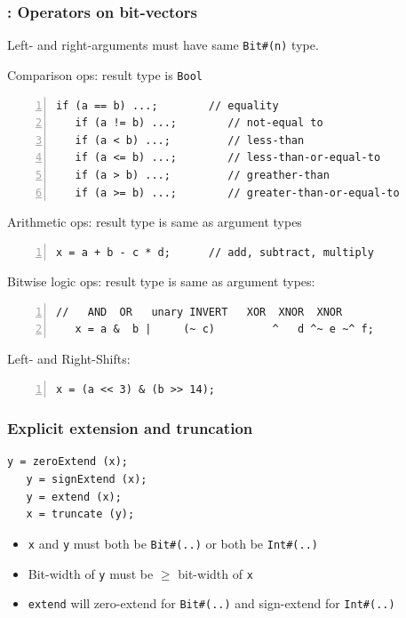 \begin{frame}[fragile]
\frametitle{{\BSV}: Operators on bit-vectors}

\footnotesize

Left- and right-arguments must have same \verb|Bit#(n)| type.

\vspace{1ex}

Comparison ops: result type is {\tt Bool}
\begin{Verbatim}[frame=single, numbers=left]
   if (a == b) ...;        // equality
   if (a != b) ...;        // not-equal to
   if (a < b) ...;         // less-than
   if (a <= b) ...;        // less-than-or-equal-to
   if (a > b) ...;         // greather-than
   if (a >= b) ...;        // greater-than-or-equal-to
\end{Verbatim}

Arithmetic ops: result type is same as argument types
\begin{Verbatim}[frame=single, numbers=left]
   x = a + b - c * d;      // add, subtract, multiply
\end{Verbatim}

Bitwise logic ops: result type is same as argument types:
\begin{Verbatim}[frame=single, numbers=left]
   //   AND  OR   unary INVERT   XOR  XNOR  XNOR
   x = a &  b |     (~ c)         ^   d ^~ e ~^ f;
\end{Verbatim}

Left- and Right-Shifts:
\begin{Verbatim}[frame=single, numbers=left]
   x = (a << 3) & (b >> 14);
\end{Verbatim}

\end{frame}


\begin{frame}[fragile]
\frametitle{Explicit extension and truncation}

\footnotesize

\begin{Verbatim}[frame=single]
   y = zeroExtend (x);
   y = signExtend (x);
   y = extend (x);
   x = truncate (y);
\end{Verbatim}

\vspace{2ex}

\begin{itemize}
 \item {\tt x} and {\tt y} must both be \verb|Bit#(..)| or both be \verb|Int#(..)|

 \item Bit-width of {\tt y} must be $\geq$ bit-width of {\tt x}

 \item \verb|extend| will zero-extend for \verb|Bit#(..)| and sign-extend for \verb|Int#(..)|
\end{itemize}

\end{frame}

